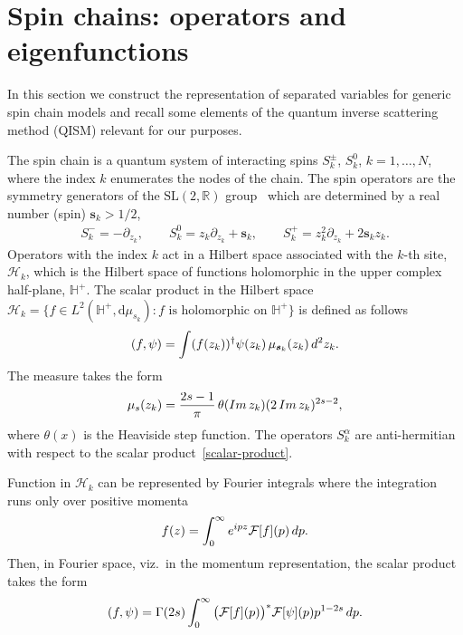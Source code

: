 \documentclass[11pt]{article}
\numberwithin{equation}{section}
\numberwithin{equation}{section}
\begin{document}
\section{Spin chains: operators and eigenfunctions}\label{sect:spinchains}

In this section we construct the representation of separated variables for generic spin chain models and recall some elements of
the quantum inverse scattering method (QISM) relevant for our purposes.

The spin chain is a quantum system of interacting spins $S_k^\pm$, $S^0_k$, $k=1,\dots, N$, where the index $k$ enumerates the nodes of the
chain. The spin operators are the symmetry generators of the $\mathrm{SL}(2,\mathbb R)$ group~\cite{MR0207913} which are determined by a
real number (spin) $\boldsymbol s_k>1/2$,
\begin{gather*}
S_k^-=-\partial_{z_k},\qquad
S_k^0=z_k\partial_{z_k}+\boldsymbol s_k,\qquad
S_k^+=z^2_k\partial_{z_k}+2\boldsymbol s_k z_k.
\end{gather*}
Operators with the index $k$ act in a Hilbert space associated with the $k$-th site, $\mathcal H_k$, which is the Hilbert space of
functions holomorphic in the upper complex half-plane, $\mathbb H^+$. The scalar product in the Hilbert space $\mathcal H_k=\big\{ f \in
L^2(\mathbb H^+,\mathrm{d}\mu_{s_k})\colon f \text{ is holomorphic on } \mathbb H^+ \big\}$ is defined as follows
\begin{gather}\label{scalar-product}
(f,\psi)=\int(f(z_k))^\dagger \psi(z_k)\, \mu_{\boldsymbol s_k}(z_k)\,{\rm d}^2z_k.
\end{gather}
The measure takes the form
\begin{gather}
\mu_{s}(z_k)=\frac{2s-1}{\pi}\,\theta(\mathop{\rm Im}z_k)
(2\mathop{\rm Im} z_k)^{2 s-2},
\label{def-measure}
\end{gather}
where $\theta(x)$ is the Heaviside step function.
 The operators $S_k^\alpha$ are anti-hermitian with respect to the scalar product~\eqref{scalar-product}.

Function in $\mathcal H_k$ can be represented by Fourier integrals where the integration runs only over positive momenta
\begin{gather*}
f(z)=\int_0^\infty {\rm e}^{{\rm i}p z} \mathcal{F}[f](p)\, {\rm d}p.
\end{gather*}
Then, in Fourier space, viz.~in the momentum representation, the scalar product takes the form
\begin{gather*}
(f,\psi) =\Gamma(2s) \int_0^\infty \big( \mathcal{F}[f](p) \big)^* \mathcal{F}[\psi](p) p^{1-2s} \, {\rm d}p.
\end{gather*}
\end{document}
